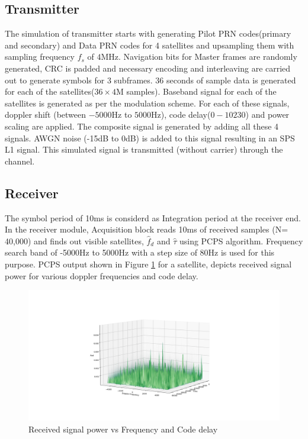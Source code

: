\documentclass[conference]{IEEEtran}
\begin{document}
\subsection{Transmitter}
The simulation of transmitter starts with generating Pilot PRN codes(primary and secondary) and 
Data PRN codes for 4 satellites and upsampling them with sampling frequency $f_s$ of $4$MHz.  
Navigation bits for Master frames are randomly generated, CRC is padded and necessary encoding and 
interleaving are carried out to generate symbols for $3$ subframes. $36$ seconds of sample data 
is generated for each of the satellites($36\times4$M samples). Baseband signal for each of the 
satellites is generated as per the modulation scheme. For each of these signals, doppler shift 
(between $-5000$Hz to $5000$Hz), code delay($0-10230$) and power scaling are applied. 
The composite signal is generated by adding all these 4 signals. AWGN noise (-15dB to 0dB) is added
to this signal resulting in an SPS L1 signal. This simulated signal is transmitted (without carrier)
through the channel.
\subsection{Receiver}
The symbol period of 10ms is considerd as Integration period at the receiver end. In the receiver 
module, Acquisition block reads 10ms of received samples (N= 40,000) and finds out visible 
satellites, $\hat{f}_d$ and $\hat{\tau}$ using PCPS algorithm. 
Frequency search band of -5000Hz to 5000Hz with a step size of 80Hz is used for this purpose.  
PCPS output shown in Figure \ref{fig:acq_output} for a satellite, depicts received signal power for 
various doppler frequencies and code delay. 

\begin{figure}[ht]
	\centering
	\includegraphics[width=1\columnwidth]{figs/acq_output.png}
	\centering
	\caption{Received signal power vs Frequency and Code delay}
	\label{fig:acq_output}
\end{figure}
\end{document}
